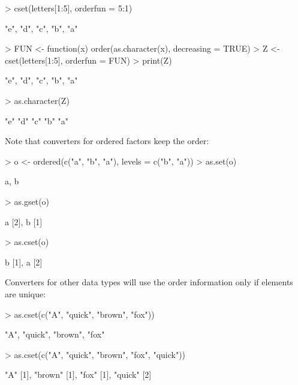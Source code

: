 \documentclass[article]{jss}
\begin{document}
\begin{Schunk}
\begin{Sinput}
> cset(letters[1:5], orderfun = 5:1)
\end{Sinput}
\begin{Soutput}
{"e", "d", "c", "b", "a"}
\end{Soutput}
\begin{Sinput}
> FUN <- function(x) order(as.character(x), decreasing = TRUE)
> Z <- cset(letters[1:5], orderfun = FUN)
> print(Z)
\end{Sinput}
\begin{Soutput}
{"e", "d", "c", "b", "a"}
\end{Soutput}
\begin{Sinput}
> as.character(Z)
\end{Sinput}
\begin{Soutput}
[1] "e" "d" "c" "b" "a"
\end{Soutput}
\end{Schunk}
Note that converters for ordered factors keep the order:
\begin{Schunk}
\begin{Sinput}
> o <- ordered(c("a", "b", "a"), levels = c("b", "a"))
> as.set(o)
\end{Sinput}
\begin{Soutput}
{a, b}
\end{Soutput}
\begin{Sinput}
> as.gset(o)
\end{Sinput}
\begin{Soutput}
{a [2], b [1]}
\end{Soutput}
\begin{Sinput}
> as.cset(o)
\end{Sinput}
\begin{Soutput}
{b [1], a [2]}
\end{Soutput}
\end{Schunk}
Converters for other data types will use the order information
only if elements are unique:
\begin{Schunk}
\begin{Sinput}
> as.cset(c("A", "quick", "brown", "fox"))
\end{Sinput}
\begin{Soutput}
{"A", "quick", "brown", "fox"}
\end{Soutput}
\begin{Sinput}
> as.cset(c("A", "quick", "brown", "fox", "quick"))
\end{Sinput}
\begin{Soutput}
{"A" [1], "brown" [1], "fox" [1], "quick" [2]}
\end{Soutput}
\end{Schunk}
\end{document}
